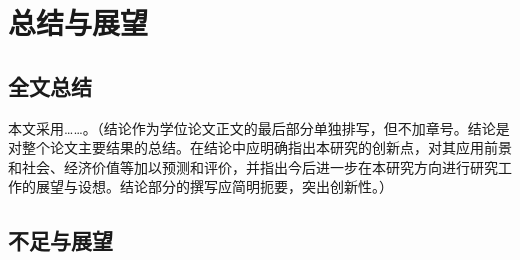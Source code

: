 \chapter{总结与展望}
\label{chap:conlution}

\section{全文总结}
本文采用……。{\color{blue}（结论作为学位论文正文的最后部分单独排写，但不加章号。结论是对整个论文主要结果的总结。在结论中应明确指出本研究的创新点，对其应用前景和社会、经济价值等加以预测和评价，并指出今后进一步在本研究方向进行研究工作的展望与设想。结论部分的撰写应简明扼要，突出创新性。）}
\section{不足与展望}
